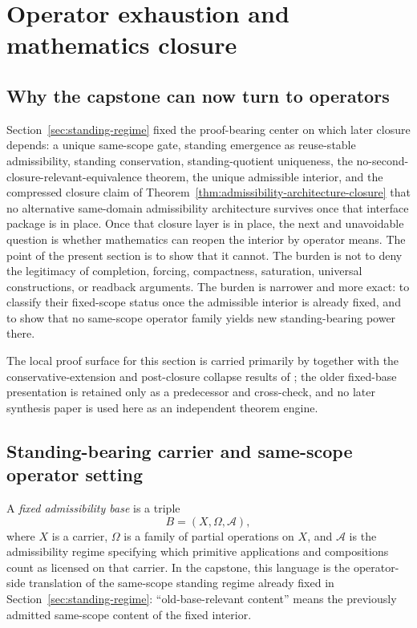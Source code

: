 \section{Operator exhaustion and mathematics closure}
\label{sec:operator-exhaustion}

\subsection{Why the capstone can now turn to operators}

Section~\ref{sec:standing-regime} fixed the proof-bearing center on which later closure depends: a unique same-scope gate, standing emergence as reuse-stable admissibility, standing conservation, standing-quotient uniqueness, the no-second-closure-relevant-equivalence theorem, the unique admissible interior, and the compressed closure claim of Theorem~\ref{thm:admissibility-architecture-closure} that no alternative same-domain admissibility architecture survives once that interface package is in place. Once that closure layer is in place, the next and unavoidable question is whether mathematics can reopen the interior by operator means. The point of the present section is to show that it cannot. The burden is not to deny the legitimacy of completion, forcing, compactness, saturation, universal constructions, or readback arguments. The burden is narrower and more exact: to classify their fixed-scope status once the admissible interior is already fixed, and to show that no same-scope operator family yields new standing-bearing power there.

The local proof surface for this section is carried primarily by \sameoperatorsdoc{} together with the conservative-extension and post-closure collapse results of \clausuradoc{}; the older fixed-base presentation is retained only as a predecessor and cross-check, and no later synthesis paper is used here as an independent theorem engine.\cite{MaleySameScopeOps,MaleyClausura,MaleyFixedBase,MaleyAMetric,MaleyEadem}

\subsection{Standing-bearing carrier and same-scope operator setting}

\begin{definition}
A \emph{fixed admissibility base} is a triple
\[
B=(X,\Omega,\mathcal A),
\]
where $X$ is a carrier, $\Omega$ is a family of partial operations on $X$, and $\mathcal A$ is the admissibility regime specifying which primitive applications and compositions count as licensed on that carrier. In the capstone, this language is the operator-side translation of the same-scope standing regime already fixed in Section~\ref{sec:standing-regime}: ``old-base-relevant content'' means the previously admitted same-scope content of the fixed interior.
\end{definition}

